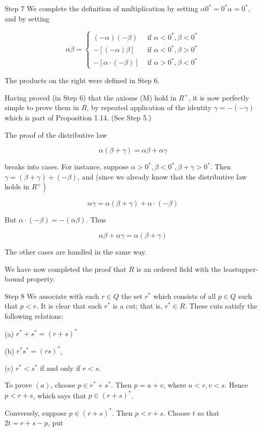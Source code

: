 \documentclass[10pt]{article}
\begin{document}
Step 7 We complete the definition of multiplication by setting $\alpha 0^{*}=0^{*} \alpha=0^{*}$, and by setting

$$
\alpha \beta= \begin{cases}(-\alpha)(-\beta) & \text { if } \alpha<0^{*}, \beta<0^{*} \\ -[(-\alpha) \beta] & \text { if } \alpha<0^{*}, \beta>0^{*} \\ -[\alpha \cdot(-\beta)] & \text { if } \alpha>0^{*}, \beta<0^{*}\end{cases}
$$

The products on the right were defined in Step 6.

Having proved (in Step 6) that the axioms (M) hold in $R^{+}$, it is now perfectly simple to prove them in $R$, by repeated application of the identity $\gamma=-(-\gamma)$ which is part of Proposition 1.14. (See Step 5.)

The proof of the distributive law

$$
\alpha(\beta+\gamma)=\alpha \beta+\alpha \gamma
$$

breaks into cases. For instance, suppose $\alpha>0^{*}, \beta<0^{*}, \beta+\gamma>0^{*}$. Then $\gamma=(\beta+\gamma)+(-\beta)$, and (since we already know that the distributive law holds in $\left.R^{+}\right)$

$$
\alpha \gamma=\alpha(\beta+\gamma)+\alpha \cdot(-\beta)
$$

But $\alpha \cdot(-\beta)=-(\alpha \beta)$. Thus

$$
\alpha \beta+\alpha \gamma=\alpha(\beta+\gamma)
$$

The other cases are handled in the same way.

We have now completed the proof that $R$ is an ordered field with the leastupper-bound property.

Step 8 We associate with each $r \in Q$ the set $r^{*}$ which consists of all $p \in Q$ such that $p<r$. It is clear that each $r^{*}$ is a cut; that is, $r^{*} \in R$. These cuts satisfy the following relations:

(a) $r^{*}+s^{*}=(r+s)^{*}$

(b) $r^{*} s^{*}=(r s)^{*}$,

(c) $r^{*}<s^{*}$ if and only if $r<s$.

To prove $(a)$, choose $p \in r^{*}+s^{*}$. Then $p=u+v$, where $u<r, v<s$. Hence $p<r+s$, which says that $p \in(r+s)^{*}$.

Conversely, suppose $p \in(r+s)^{*}$. Then $p<r+s$. Choose $t$ so that $2 t=r+s-p$, put
\end{document}
